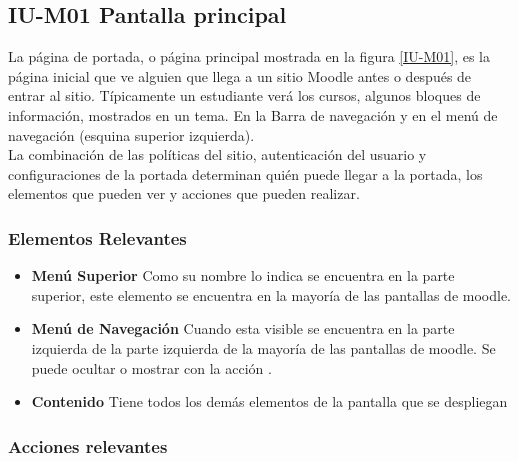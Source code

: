 
\subsection{IU-M01 Pantalla principal}

 La página de portada, o página principal mostrada en la figura \ref{IU-M01}, es la
 página inicial que ve alguien que llega a un sitio Moodle antes o después de entrar al sitio.
 Típicamente un estudiante verá los cursos, algunos bloques de información, mostrados en un tema.
 En la Barra de navegación y en el menú de navegación (esquina superior izquierda).\\

 \noindent 
 La combinación de las políticas del sitio, autenticación del usuario y configuraciones de la
 portada determinan quién puede llegar a la portada, los elementos que pueden ver y acciones
 que pueden realizar. \cite{MoodlePortada} 


\subsubsection{Elementos Relevantes}

    \begin{itemize}

    \item {\bf Menú Superior}
        Como su nombre lo indica se encuentra en la parte superior, este elemento se encuentra
        en la mayoría de las pantallas de moodle.

    \item {\bf Menú de Navegación}
        Cuando esta visible se encuentra en la parte izquierda de la parte izquierda
        de la mayoría de las pantallas de moodle. Se puede ocultar o mostrar con la
        acción \IUMenu[].

    \item {\bf Contenido}
        Tiene todos los demás elementos de la pantalla que se despliegan

    \end{itemize}

\subsubsection{Acciones relevantes}


